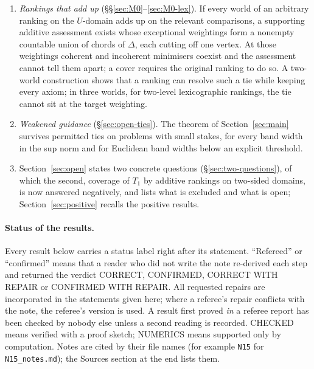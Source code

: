 \documentclass[11pt]{article}
\theoremstyle{definition}
\theoremstyle{remark}
\newcommand{\src}[1]{\texttt{#1}}
\begin{document}
\begin{enumerate}[leftmargin=*]
\item \emph{Rankings that add up} (\S\S\ref{sec:M0}--\ref{sec:M0-lex}). If every world of an arbitrary ranking on the $U$-domain adds up on the relevant comparisons, a supporting additive assessment exists whose exceptional weightings form a nonempty countable union of chords of $\Delta$, each cutting off one vertex. At those weightings coherent and incoherent minimisers coexist and the assessment cannot tell them apart; a cover requires the original ranking to do so. A two-world construction shows that a ranking can resolve such a tie while keeping every axiom; in three worlds, for two-level lexicographic rankings, the tie cannot sit at the target weighting.
\item \emph{Weakened guidance} (\S\ref{sec:open-ties}). The theorem of Section~\ref{sec:main} survives permitted ties on problems with small stakes, for every band width in the sup norm and for Euclidean band widths below an explicit threshold.
\item Section~\ref{sec:open} states two concrete questions (\S\ref{sec:two-questions}), of which the second, coverage of $T_1$ by additive rankings on two-sided domains, is now answered negatively, and lists what is excluded and what is open; Section~\ref{sec:positive} recalls the positive results.
\end{enumerate}

\paragraph{Status of the results.}
Every result below carries a status label right after its statement. ``Refereed'' or ``confirmed'' means that a reader who did not write the note re-derived each step and returned the verdict CORRECT, CONFIRMED, CORRECT WITH REPAIR or CONFIRMED WITH REPAIR. All requested repairs are incorporated in the statements given here; where a referee's repair conflicts with the note, the referee's version is used. A result first proved \emph{in} a referee report has been checked by nobody else unless a second reading is recorded. CHECKED means verified with a proof sketch; NUMERICS means supported only by computation. Notes are cited by their file names (for example \src{N15} for \src{N15\_notes.md}); the Sources section at the end lists them.
\end{document}
